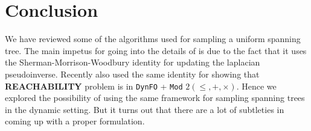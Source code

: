 
\chapter{Conclusion} %

\label{Chapter6} %


We have reviewed some of the algorithms used for sampling a uniform spanning tree. The main impetus for going into the details of \citet{harvey2016generating} is due to the fact that it uses the Sherman-Morrison-Woodbury identity for updating the laplacian pseudoinverse. Recently \citet{DBLP:journals/corr/abs-2004-12739} also used the same identity for showing that \textbf{REACHABILITY} problem is in \texttt{DynFO} + \texttt{Mod} $2(\leq, +, \times)$. Hence we explored the possibility of using the same framework for sampling spanning trees in the dynamic setting. But it turns out that there are a lot of subtleties in coming up with a proper formulation. 








